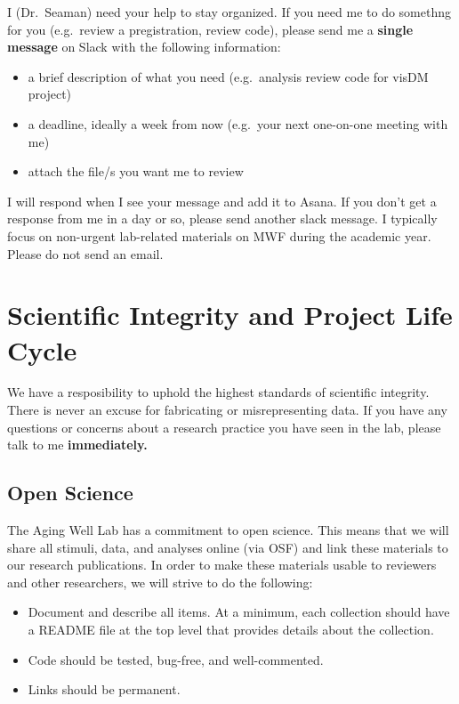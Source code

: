 \documentclass[
]{book}
\providecommand{\tightlist}{%
  \setlength{\itemsep}{0pt}\setlength{\parskip}{0pt}}
\begin{document}
I (Dr.~Seaman) need your help to stay organized. If you need me to do somethng for you (e.g.~review a pregistration, review code), please send me a \textbf{single message} on Slack with the following information:

\begin{itemize}
\item
  a brief description of what you need (e.g.~analysis review code for visDM project)
\item
  a deadline, ideally a week from now (e.g.~your next one-on-one meeting with me)
\item
  attach the file/s you want me to review
\end{itemize}

I will respond when I see your message and add it to Asana. If you don't get a response from me in a day or so, please send another slack message. I typically focus on non-urgent lab-related materials on MWF during the academic year. Please do not send an email.

\hypertarget{scientific-integrity-and-project-life-cycle}{%
\chapter{Scientific Integrity and Project Life Cycle}\label{scientific-integrity-and-project-life-cycle}}

We have a resposibility to uphold the highest standards of scientific integrity. There is never an excuse for fabricating or misrepresenting data. If you have any questions or concerns about a research practice you have seen in the lab, please talk to me \textbf{immediately.}

\hypertarget{open-science}{%
\section{Open Science}\label{open-science}}

The Aging Well Lab has a commitment to open science. This means that we will share all stimuli, data, and analyses online (via OSF) and link these materials to our research publications. In order to make these materials usable to reviewers and other researchers, we will strive to do the following:

\begin{itemize}
\tightlist
\item
  Document and describe all items. At a minimum, each collection should have a README file at the top level that provides details about the collection.\\
\item
  Code should be tested, bug-free, and well-commented.\\
\item
  Links should be permanent.
\end{itemize}
\end{document}
